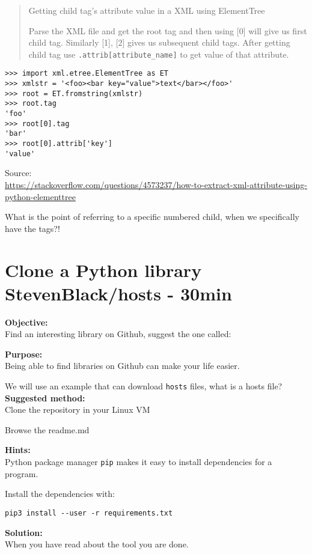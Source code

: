 \documentclass[a4paper,11pt,notitlepage]{report}
\begin{document}
\begin{quote}
Getting child tag's attribute value in a XML using ElementTree

Parse the XML file and get the root tag and then using [0] will give us first child tag. Similarly [1], [2] gives us subsequent child tags. After getting child tag use \verb+.attrib[attribute_name]+ to get value of that attribute.
\end{quote}
\begin{verbatim}
>>> import xml.etree.ElementTree as ET
>>> xmlstr = '<foo><bar key="value">text</bar></foo>'
>>> root = ET.fromstring(xmlstr)
>>> root.tag
'foo'
>>> root[0].tag
'bar'
>>> root[0].attrib['key']
'value'
\end{verbatim}
Source:\\{\footnotesize \url{https://stackoverflow.com/questions/4573237/how-to-extract-xml-attribute-using-python-elementtree}}

What is the point of referring to a specific numbered child, when we specifically have the tags?!

\chapter{Clone a Python library StevenBlack/hosts - 30min}
\label{ex:git-clone-XX}

{\bf Objective:}\\
Find an interesting library on Github, suggest the one called:


{\bf Purpose:}\\
Being able to find libraries on Github can make your life easier.

We will use an example that can download \verb+hosts+ files, what is a hosts file?
{\bf Suggested method:}\\
Clone the repository in your Linux VM

Browse the readme.md

{\bf Hints:}\\
Python package manager \verb+pip+ makes it easy to install dependencies for a program.

Install the dependencies with:

\begin{verbatim}
pip3 install --user -r requirements.txt
\end{verbatim}


{\bf Solution:}\\
When you have read about the tool you are done.
\end{document}
